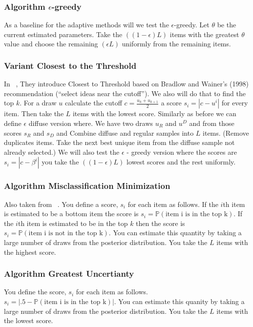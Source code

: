 \documentclass[nonblindrev]{informs3}
\begin{document}
\subsubsection{Algorithm $\epsilon$-greedy}
As a baseline for the adaptive methods will we test the $\epsilon$-greedy.
Let $\theta$ be the current estimated parameters. Take the $((1-\epsilon)L)$ items with the greatest $\theta$ value and choose the remaining $(\epsilon L)$ uniformly from the remaining items.

\subsubsection{Variant Closest to the Threshold}
In ~\cite{toubia2007adaptive},  They introduce Closest to Threshold based on Bradlow and Wainer’s (1998) recommendation
(``select ideas near the cutoff''). We also will do that to find the top $k$. For a draw $u$ calculate the cutoff $c=\frac{u_k+u_{k+1}}{2}$ a score $s_i=|c-u^i|$ for every item. Then take the $L$ items with the lowest score. Similarly as before we can define $\epsilon$ diffuse version where. We have two draws $u_R$ and $u^D$ and from those scores $s_R$ and $s_D$ and Combine diffuse and regular samples into $L$ items. (Remove duplicates items. Take the next best unique item from the diffuse sample not already selected.) We will also test the $\epsilon$ - greedy version where the scores are $s_i=|c-\beta^i|$ you take the $((1-\epsilon)L)$ lowest scores and the rest uniformly.

\subsubsection{Algorithm Misclassification Minimization}
Also taken from ~\cite{toubia2007adaptive}. You define a score, $s_i$ for each item as follows. If the $i$th item is estimated to be a bottom item the score is $s_i=\mathbb{P}(\text{item i is in the top k})$. If the $i$th  item is estimated to be in the top $k$ then the score is $s_i=\mathbb{P}(\text{item i is not in the top k})$. You can estimate this quantity by taking a large number of draws from the posterior distribution. You take the $L$ items with the highest score.

\subsubsection{Algorithm Greatest Uncertianty}
You define the score, $s_i$ for each item as follows. $s_i=|.5-\mathbb{P}(\text{item i is in the top k})|$. You can estimate this quanity by taking a large number of draws from the posterior distribution. You take the $L$ items with the lowest score.
\end{document}
